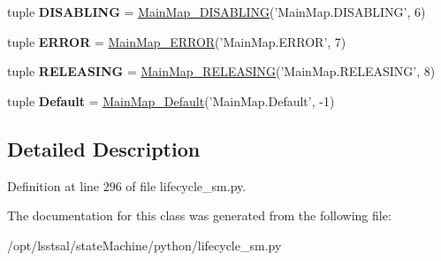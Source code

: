 \begin{DoxyCompactItemize}
\item 
\hypertarget{classlifecycle__sm_1_1_main_map_a7ae1e8aab13a1868f7c9ae8555e5b5cd}{tuple {\bfseries D\-I\-S\-A\-B\-L\-I\-N\-G} = \hyperlink{classlifecycle__sm_1_1_main_map___d_i_s_a_b_l_i_n_g}{Main\-Map\-\_\-\-D\-I\-S\-A\-B\-L\-I\-N\-G}('Main\-Map.\-D\-I\-S\-A\-B\-L\-I\-N\-G', 6)}\label{classlifecycle__sm_1_1_main_map_a7ae1e8aab13a1868f7c9ae8555e5b5cd}

\item 
\hypertarget{classlifecycle__sm_1_1_main_map_a3a584b30e7422467ed61a9325d8a9965}{tuple {\bfseries E\-R\-R\-O\-R} = \hyperlink{classlifecycle__sm_1_1_main_map___e_r_r_o_r}{Main\-Map\-\_\-\-E\-R\-R\-O\-R}('Main\-Map.\-E\-R\-R\-O\-R', 7)}\label{classlifecycle__sm_1_1_main_map_a3a584b30e7422467ed61a9325d8a9965}

\item 
\hypertarget{classlifecycle__sm_1_1_main_map_afa36c6bcbd064b03b3f8a242ea784740}{tuple {\bfseries R\-E\-L\-E\-A\-S\-I\-N\-G} = \hyperlink{classlifecycle__sm_1_1_main_map___r_e_l_e_a_s_i_n_g}{Main\-Map\-\_\-\-R\-E\-L\-E\-A\-S\-I\-N\-G}('Main\-Map.\-R\-E\-L\-E\-A\-S\-I\-N\-G', 8)}\label{classlifecycle__sm_1_1_main_map_afa36c6bcbd064b03b3f8a242ea784740}

\item 
\hypertarget{classlifecycle__sm_1_1_main_map_ad912022d58e64016c5b9041e3bbd0e4c}{tuple {\bfseries Default} = \hyperlink{classlifecycle__sm_1_1_main_map___default}{Main\-Map\-\_\-\-Default}('Main\-Map.\-Default', -\/1)}\label{classlifecycle__sm_1_1_main_map_ad912022d58e64016c5b9041e3bbd0e4c}

\end{DoxyCompactItemize}


\subsection{Detailed Description}


Definition at line 296 of file lifecycle\-\_\-sm.\-py.



The documentation for this class was generated from the following file\-:\begin{DoxyCompactItemize}
\item 
/opt/lsstsal/state\-Machine/python/lifecycle\-\_\-sm.\-py\end{DoxyCompactItemize}

